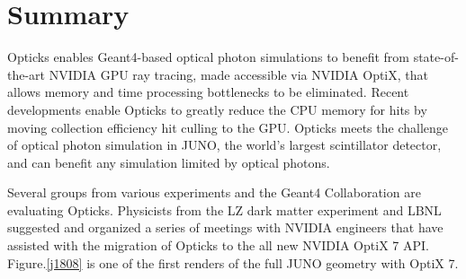 \documentclass{webofc}
\begin{document}
\section{Summary}
%
Opticks enables Geant4-based optical photon simulations to benefit from 
state-of-the-art NVIDIA GPU ray tracing, made accessible via NVIDIA OptiX,
that allows memory and time processing bottlenecks to be eliminated.
Recent developments enable Opticks to greatly reduce the CPU memory for hits 
by moving collection efficiency hit culling to the GPU. 
Opticks meets the challenge of optical photon simulation in JUNO, 
the world's largest scintillator detector, and can benefit any simulation limited by optical photons. 

Several groups from various experiments and the Geant4 Collaboration are evaluating Opticks.
Physicists from the LZ dark matter experiment and LBNL suggested and 
organized a series of meetings with NVIDIA engineers that have assisted with the 
migration of Opticks to the all new NVIDIA OptiX 7 API. Figure.\ref{j1808} 
is one of the first renders of the full JUNO geometry with OptiX 7.
%
%
\newpage
\end{document}
